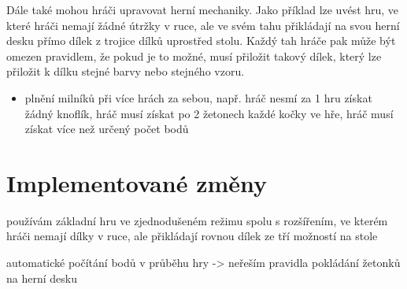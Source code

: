 Dále také mohou hráči upravovat herní mechaniky. Jako příklad lze uvést hru, ve které hráči nemají žádné útržky v ruce, ale ve svém tahu přikládají na svou herní desku přímo dílek z trojice dílků uprostřed stolu. Každý tah hráče pak může být omezen pravidlem, že pokud je to možné, musí přiložit takový dílek, který lze přiložit k dílku stejné barvy nebo stejného vzoru.

\begin{itemize}
    \item plnění milníků při více hrách za sebou, např. hráč nesmí za 1 hru získat žádný knoflík, hráč musí získat po 2 žetonech každé kočky ve hře, hráč musí získat více než určený počet bodů
\end{itemize}

\section{Implementované změny}

používám základní hru ve zjednodušeném režimu spolu s rozšířením, ve kterém hráči nemají dílky v ruce, ale přikládají rovnou dílek ze tří možností na stole

automatické počítání bodů v průběhu hry -> neřeším pravidla pokládání žetonků na herní desku

